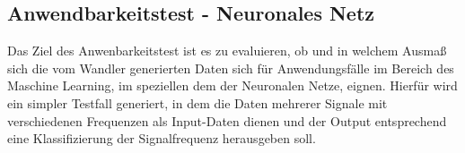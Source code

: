 \subsection{Anwendbarkeitstest - Neuronales Netz}

Das Ziel des Anwenbarkeitstest ist es zu evaluieren, ob und in welchem Ausmaß sich die vom Wandler generierten Daten sich für Anwendungsfälle im Bereich des Maschine Learning, im speziellen dem der Neuronalen Netze, eignen. Hierfür wird ein simpler Testfall generiert, in dem die Daten mehrerer Signale mit verschiedenen Frequenzen als Input-Daten dienen und der Output entsprechend eine Klassifizierung der Signalfrequenz herausgeben soll. 

